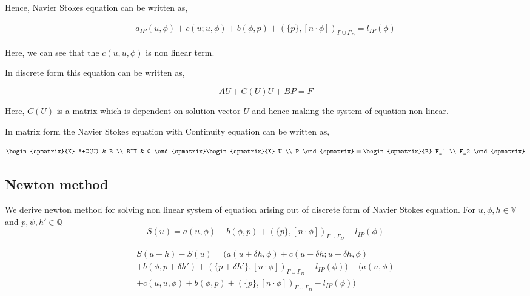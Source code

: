 \documentclass[a4paper,12pt]{book}
\begin{document}
Hence, Navier Stokes equation can be written as,

\begin{equation}\label{navier_stokes_weak}
\begin{split}
a_{IP}(u,\phi) + c(u;u,\phi) + b(\phi,p) + (\{p\},[n\cdot \phi])_{\Gamma \cup \Gamma_D} = l_{IP}(\phi) 
\end{split}
\end{equation}

Here, we can see that the $c(u,u,\phi)$ is non linear term.

In discrete form this equation can be written as,

\begin{equation}
AU + C(U) U + BP = F
\end{equation} 

Here, $C(U)$ is a matrix which is dependent on solution vector $U$ and hence making the system of equation non linear.

In matrix form the Navier Stokes equation with Continuity equation can be written as,

\begin{equation} \label{Stokes_matrix}
\begin{spmatrix}{K}
    A+C(U) & B \\
    B^T & 0
\end{spmatrix}
\begin{spmatrix}{X}
    U \\
    P
\end{spmatrix}
=
\begin{spmatrix}{B}
    F_1  \\
    F_2
\end{spmatrix}
\end{equation}

\subsection{Newton method} \cite{Haasdonk} \label{newton_method}

We derive newton method for solving non linear system of equation arising out of discrete form of Navier Stokes equation. For $u, \phi , h \in \mathbb{V}$ and $p, \psi , h' \in \mathbb{Q}$ \\
\begin{equation}
S(u) = a(u,\phi) + b(\phi,p) + (\{p\},[n\cdot \phi])_{\Gamma \cup \Gamma_D} - l_{IP}(\phi)
\end{equation}


\begin{equation}
\begin{split}
S(u+h) - S(u) = (a(u+\delta h,\phi) + c(u + \delta h;u + \delta h,\phi)\\ + b(\phi,p+\delta h') + (\{p+\delta h'\},[n\cdot \phi])_{\Gamma \cup \Gamma_D} - l_{IP}(\phi)) - (a(u,\phi)\\ + c(u,u,\phi) + b(\phi,p) + (\{p\},[n\cdot \phi])_{\Gamma \cup \Gamma_D} - l_{IP}(\phi))
\end{split}
\end{equation}
\end{document}
